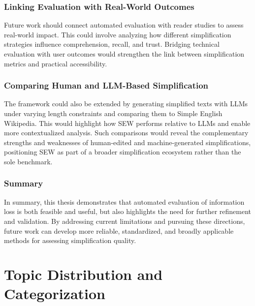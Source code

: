 \documentclass{DESSThesis}
\begin{document}
\subsection{Linking Evaluation with Real-World Outcomes}
Future work should connect automated evaluation with reader studies to assess real-world impact. This could involve analyzing how different simplification strategies influence comprehension, recall, and trust. Bridging technical evaluation with user outcomes would strengthen the link between simplification metrics and practical accessibility.  

\subsection{Comparing Human and LLM-Based Simplification}
The framework could also be extended by generating simplified texts with LLMs under varying length constraints and comparing them to Simple English Wikipedia. This would highlight how SEW performs relative to LLMs and enable more contextualized analysis. Such comparisons would reveal the complementary strengths and weaknesses of human-edited and machine-generated simplifications, positioning SEW as part of a broader simplification ecosystem rather than the sole benchmark.  

\subsection{Summary}
In summary, this thesis demonstrates that automated evaluation of information loss is both feasible and useful, but also highlights the need for further refinement and validation. By addressing current limitations and pursuing these directions, future work can develop more reliable, standardized, and broadly applicable methods for assessing simplification quality.

\newpage
\appendix
\chapter{Topic Distribution and Categorization}
\end{document}

